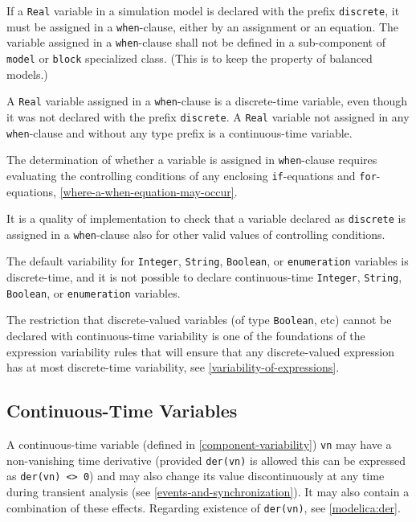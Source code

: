 If a \lstinline!Real! variable in a simulation model is declared with the prefix \lstinline!discrete!, it must be assigned in a \lstinline!when!-clause, either by an assignment or an equation.
The variable assigned in a \lstinline!when!-clause shall not be defined in a sub-component of \lstinline!model! or \lstinline!block! specialized class.
(This is to keep the property of balanced models.)

A \lstinline!Real! variable assigned in a \lstinline!when!-clause is a discrete-time variable, even though it was not declared with the prefix \lstinline!discrete!.
A \lstinline!Real! variable not assigned in any \lstinline!when!-clause and without any type prefix is a continuous-time variable.

The determination of whether a variable is assigned in \lstinline!when!-clause requires evaluating the controlling conditions of any enclosing \lstinline!if!-equations and \lstinline!for!-equations, \cref{where-a-when-equation-may-occur}.
\begin{nonnormative}
It is a quality of implementation to check that a variable declared as \lstinline!discrete! is assigned in a \lstinline!when!-clause also for other valid values of controlling conditions.
\end{nonnormative}

The default variability for \lstinline!Integer!, \lstinline!String!, \lstinline!Boolean!, or \lstinline!enumeration! variables is discrete-time, and it is not possible to declare continuous-time \lstinline!Integer!, \lstinline!String!, \lstinline!Boolean!, or \lstinline!enumeration! variables.

\begin{nonnormative}
The restriction that discrete-valued variables (of type \lstinline!Boolean!, etc) cannot be declared with continuous-time variability is one of the foundations of the expression variability rules that will ensure that any discrete-valued expression has at most discrete-time variability, see \cref{variability-of-expressions}.
\end{nonnormative}


\subsection{Continuous-Time Variables}\label{continuous-time-variables}

A continuous-time variable (defined in \cref{component-variability}) \lstinline!vn! may have a non-vanishing time derivative (provided \lstinline!der(vn)! is allowed this can be expressed as \lstinline!der(vn) <> 0!) and may also change its value discontinuously at any time during transient analysis (see \cref{events-and-synchronization}).
It may also contain a combination of these effects.
Regarding existence of \lstinline!der(vn)!, see \cref{modelica:der}.


